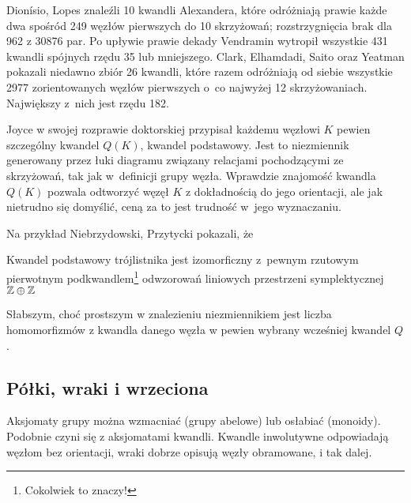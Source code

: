 Dionísio, Lopes \cite{lopes2003} znaleźli 10 kwandli Alexandera, które odróżniają prawie każde dwa spośród 249 węzłów pierwszych do 10 skrzyżowań; rozstrzygnięcia brak dla 962 z 30876 par.
%
%
Po upływie prawie dekady Vendramin \cite{vendramin2012} wytropił wszystkie 431 kwandli spójnych rzędu 35 lub mniejszego.
%
Clark, Elhamdadi, Saito oraz Yeatman \cite{clark2013} pokazali niedawno zbiór 26 kwandli, które razem odróżniają od siebie wszystkie 2977 zorientowanych węzłów pierwszych o~co najwyżej 12 skrzyżowaniach.
%
%
%
%
Największy z~nich jest rzędu 182.

Joyce w swojej rozprawie doktorskiej przypisał każdemu węzłowi $K$ pewien szczególny kwandel $Q(K)$, kwandel podstawowy.
%
%
Jest to niezmiennik generowany przez łuki diagramu związany relacjami pochodzącymi ze skrzyżowań, tak jak w~definicji grupy węzła.
Wprawdzie znajomość kwandla $Q(K)$ pozwala odtworzyć węzęł $K$ z dokładnością do jego orientacji, ale jak nietrudno się domyślić, ceną za to jest trudność w~jego wyznaczaniu.

Na przykład Niebrzydowski, Przytycki \cite{niebrzydowski2009} pokazali, że
%
%

\begin{example}
    Kwandel podstawowy trójlistnika  jest izomorficzny z~pewnym rzutowym pierwotnym podkwandlem\footnote{Cokolwiek to znaczy!} odwzorowań liniowych przestrzeni symplektycznej $\mathbb Z \oplus \mathbb Z$
\end{example}

Słabszym, choć prostszym w znalezieniu niezmiennikiem jest liczba homomorfizmów z kwandla danego węzła w pewien wybrany wcześniej kwandel $Q$.

\subsection{Półki, wraki i wrzeciona}
Aksjomaty grupy można wzmacniać (grupy abelowe) lub osłabiać (monoidy).
Podobnie czyni się z aksjomatami kwandli.
Kwandle inwolutywne odpowiadają węzłom bez orientacji, wraki dobrze opisują węzły obramowane, i tak dalej.
%
%


